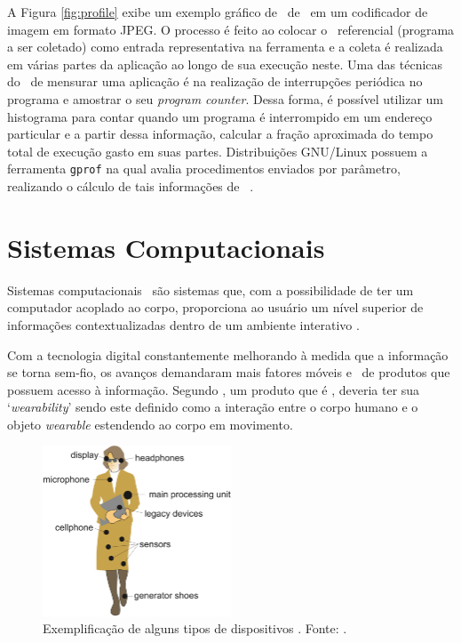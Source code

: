       A Figura \ref{fig:profile} exibe um exemplo gráfico de \profile\ de \software\ em um codificador de imagem em formato JPEG.
      O processo é feito ao colocar o \software\ referencial (programa a ser coletado) como entrada representativa na ferramenta e a coleta é realizada em várias partes da aplicação ao longo de sua execução neste.
		Uma das técnicas do \profile\ de mensurar uma aplicação é na realização de interrupções periódica no programa e amostrar o seu \textit{program counter}.
      Dessa forma, é possível utilizar um histograma para contar quando um programa é interrompido em um endereço particular e a partir dessa informação, calcular a fração aproximada do tempo total de execução gasto em suas partes.
      Distribuições GNU/Linux possuem a ferramenta \texttt{gprof} na qual avalia procedimentos enviados por parâmetro, realizando o cálculo de tais informações de \software\ \citep{Graham1982}.





\section{Sistemas Computacionais \Wearables}
	Sistemas computacionais \wearables\ são sistemas que, com a possibilidade de ter um computador acoplado ao corpo, proporciona ao usuário um nível superior de informações contextualizadas dentro de um ambiente interativo \citep{Amorim2017}.

   Com a tecnologia digital constantemente melhorando à medida que a informação se torna sem-fio, os avanços demandaram mais fatores móveis e \wearable\ de produtos que possuem acesso à informação.
   Segundo \cite{Gemperle1998}, um produto que é \wearable, deveria ter sua `\textit{wearability}' sendo este definido como a interação entre o corpo humano e o objeto \textit{wearable} estendendo ao corpo em movimento.

	\begin{figure} \centering
    	  \vspace{-10pt}
		\includegraphics[width=0.5\textwidth]{img/into-wearable2.png}
        \vspace{-10pt}
		\caption{Exemplificação de alguns tipos de dispositivos \wearables. Fonte: \citet{Plessl2003}. \vspace{-15pt}}
		\label{fig:into-wearable}
	\end{figure}

